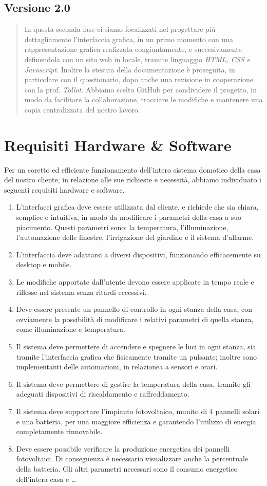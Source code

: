 \documentclass[italian, 12pt, a4paper]{article}
\begin{document}
\subsection{Versione 2.0}
\begin{quote}
    In questa seconda fase ci siamo focalizzati nel progettare più dettagliamente l'interfaccia grafica, in un primo momento con una rappresentazione grafica realizzata congiuntamente, e succesivamente definendola con un sito web in locale, tramite linguaggio \emph{HTML, CSS e Javascript}. Inoltre la stesura della documentazione è proseguita, in particolare con il questionario, dopo anche una revisione in cooperazione con la prof. \emph{Tollot}. Abbiamo scelto GitHub per condividere il progetto, in modo da facilitare la collaborazione, tracciare le modifiche e mantenere una copia centralizzata del nostro lavoro.
\end{quote}
\clearpage
\section{Requisiti Hardware \& Software}\label{sec:requisiti}
Per un coretto ed efficiente funzionamento dell'intero sistema domotico della casa del nostro cliente, in relazione alle sue richieste e necessità, abbiamo individuato i seguenti requisiti hardware e software.
\begin{enumerate}
    \item L'interfacci grafica deve essere utilizzata dal cliente, e richiede che sia chiara, semplice e intuitiva, in modo da modificare i parametri della casa a suo piacimento. Questi parametri sono: la temperatura, l'illuminazione, l'automazione delle finestre, l'irrigazione del giardino e il sistema d'allarme.
    \item L’interfaccia deve adattarsi a diversi dispositivi, funzionando efficacemente su desktop e mobile.
    \item Le modifiche apportate dall’utente devono essere applicate in tempo reale e riflesse nel sistema senza ritardi eccessivi.
    \item Deve essere presente un pannello di controllo in ogni stanza della casa, con ovviamente la possibilità di modificare i relativi parametri di quella stanza, come illuminazione e temperatura.
    \item Il sistema deve permettere di accendere e spegnere le luci in ogni stanza, sia tramite l'interfaccia grafica che fisicamente tramite un pulsante; inoltre sono implementanti delle automazioni, in relazionea a sensori e orari.
    \item Il sistema deve permettere di gestire la temperatura della casa, tramite gli adeguati dispositivi di riscaldamento e raffreddamento.
    \item Il sistema deve supportare l'impianto fotovoltaico, munito di 4 pannelli solari e una batteria, per una maggiore efficienza e garantendo l’utilizzo di energia completamente rinnovabile.
    \item Deve essere possibile verificare la produzione energetica dei pannelli fotovoltaici. Di conseguenza è necessario visualizzare anche la percentuale della batteria. Gli altri parametri necessari sono il consumo energetico dell’intera casa e \ldots
\end{enumerate}
\clearpage
\end{document}
